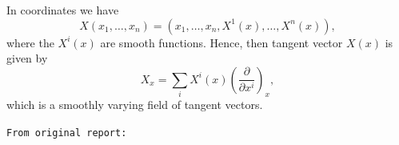 
\clearpage

\noindent In coordinates we have
\[
X(x_1,\ldots,x_n)=\left(x_1,\ldots,x_n,X^1(x),\ldots,X^n(x)\right),
\]
where the $X^i(x)$ are smooth functions. Hence, then tangent vector $X(x)$ is given by
\[
X_x=\sum_iX^i(x)\left(\frac{\partial}{\partial x^i}\right)_x,
\]
which is a smoothly varying field of tangent vectors.

\noindent\texttt{From original report:}

